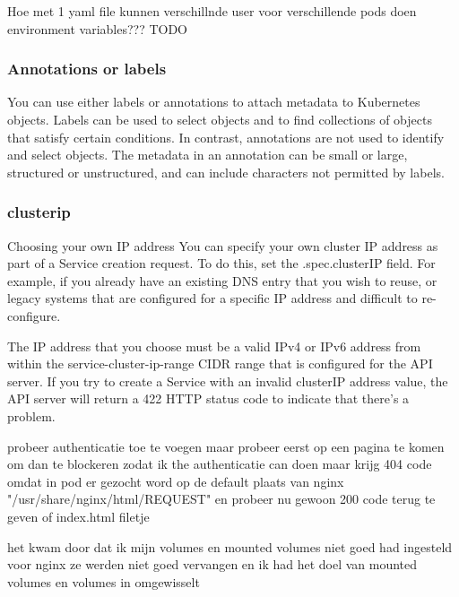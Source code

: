 Hoe met 1 yaml file kunnen verschillnde user voor verschillende pods doen environment variables??? TODO


\subsubsection{Annotations or labels}


You can use either labels or annotations to attach metadata to Kubernetes objects. Labels can be used to select objects and to find collections of objects that satisfy certain conditions. In contrast, annotations are not used to identify and select objects. The metadata in an annotation can be small or large, structured or unstructured, and can include characters not permitted by labels.


\subsubsection{clusterip}


Choosing your own IP address
You can specify your own cluster IP address as part of a Service creation request. To do this, set the .spec.clusterIP field. For example, if you already have an existing DNS entry that you wish to reuse, or legacy systems that are configured for a specific IP address and difficult to re-configure.

The IP address that you choose must be a valid IPv4 or IPv6 address from within the service-cluster-ip-range CIDR range that is configured for the API server. If you try to create a Service with an invalid clusterIP address value, the API server will return a 422 HTTP status code to indicate that there's a problem.
\newline

probeer authenticatie toe te voegen maar probeer eerst op een pagina te komen om dan te blockeren zodat ik the authenticatie can doen maar krijg 404 code omdat in pod er gezocht word op de default plaats van nginx "/usr/share/nginx/html/REQUEST" en probeer nu gewoon 200 code terug te geven of index.html filetje

het kwam door dat ik mijn volumes en mounted volumes niet goed had ingesteld voor nginx ze werden niet goed vervangen en ik had het doel van mounted volumes en volumes in omgewisselt

